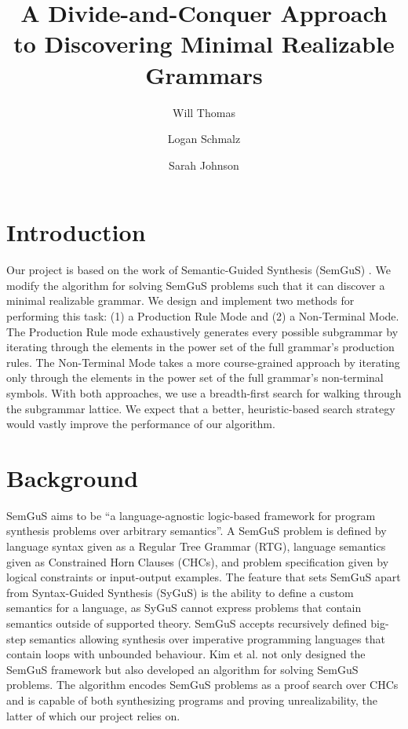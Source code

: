 \documentclass[acmsmall, nonacm]{acmart}
\begin{document}
\title{A Divide-and-Conquer Approach to Discovering Minimal Realizable Grammars}


\author{Will Thomas}
\author{Logan Schmalz}
\author{Sarah Johnson}


\maketitle

\section{Introduction}
Our project is based on the work of Semantic-Guided Synthesis (SemGuS) \cite{semgus}. We modify the algorithm for solving SemGuS problems such that it can discover a minimal realizable grammar. We design and implement two methods for performing this task: (1) a Production Rule Mode and (2) a Non-Terminal Mode. The Production Rule mode exhaustively generates every possible subgrammar by iterating through the elements in the power set of the full grammar's production rules. The Non-Terminal Mode takes a more course-grained approach by iterating only through the elements in the power set of the full grammar's non-terminal symbols. With both approaches, we use a breadth-first search for walking through the subgrammar lattice. We expect that a better, heuristic-based search strategy would vastly improve the performance of our algorithm.


\section{Background}
SemGuS aims to be ``a language-agnostic logic-based framework for program synthesis problems over arbitrary semantics''. A SemGuS problem is defined by language syntax given as a Regular Tree Grammar (RTG), language semantics given as Constrained Horn Clauses (CHCs), and problem specification given by logical constraints or input-output examples. The feature that sets SemGuS apart from Syntax-Guided Synthesis (SyGuS) is the ability to define a custom semantics for a language, as SyGuS cannot express problems that contain semantics outside of supported theory. SemGuS accepts recursively defined 
big-step semantics allowing synthesis over imperative programming languages that contain loops with unbounded behaviour. Kim et al. not only designed the SemGuS framework but also developed an algorithm for solving SemGuS problems. The algorithm encodes SemGuS problems as a proof search over CHCs and is capable of both synthesizing programs and proving unrealizability, the latter of which our project relies on.
\end{document}
